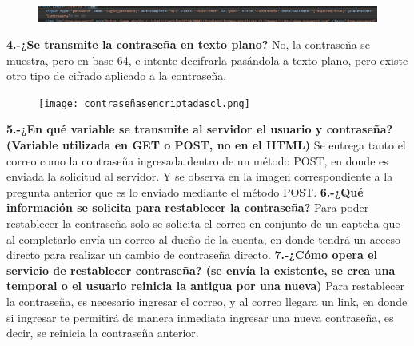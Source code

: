 \documentclass{article}
\begin{document}
\begin{figure}[h!]
    \centering
    \includegraphics[width=14cm]{limpass.PNG}
\end{figure}
\newline
\textbf{ 4.-¿Se transmite la contraseña en texto plano?}
\newline
   No, la contraseña se muestra, pero en base 64, e intente decifrarla pasándola a texto plano, pero existe otro tipo de cifrado aplicado a la contraseña.
\begin{figure}[h!]
    \centering
    \texttt{[image: contraseñasencriptadascl.png]}

\end{figure}
\newline
\textbf{ 5.-¿En qué variable se transmite al servidor el usuario y contraseña? (Variable utilizada en GET o POST, no en el HTML)}
\newline
Se entrega tanto el correo como la contraseña ingresada dentro de un método POST, en donde es enviada la solicitud al servidor. Y se observa en la imagen correspondiente a la pregunta anterior que es lo enviado mediante el método POST.
\newpage
\textbf{ 6.-¿Qué información se solicita para restablecer la contraseña?}
\newline
Para poder restablecer la contraseña solo se solicita el correo en conjunto de un captcha que al completarlo envía un correo al dueño de la cuenta, en donde tendrá un acceso directo para realizar un cambio de contraseña directo.
\newline 
\textbf{7.-¿Cómo opera el servicio de restablecer contraseña? (se envía la existente, se crea una temporal o el usuario reinicia la antigua por una nueva)}
 \newline 
Para restablecer la contraseña, es necesario ingresar el correo, y al correo llegara un link, en donde si ingresar te permitirá de manera inmediata ingresar una nueva contraseña, es decir, se reinicia la contraseña anterior. 
\newline
\end{document}
